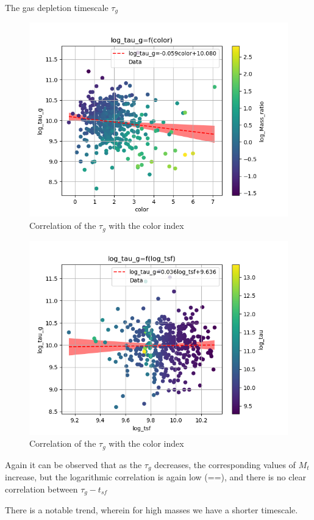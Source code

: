 \documentclass[presentation]{beamer}
\begin{document}
\begin{frame}[label={sec:org40e1c03}]{The gas depletion timescale \(\tau_g\) \label{SEC:tau_g}}
\begin{figure}[!htpb]
\centering
\includegraphics[width=.9\linewidth]{./figs/color-log_tau_g-color_log_Mass_ratio.png}
\caption{\label{fig:Correlation of the $\tau_g$ with the color index}Correlation of the \(\tau_g\) with the color index}
\end{figure}


\begin{figure}[!htpb]
\centering
\includegraphics[width=.9\linewidth]{./figs/log_tsf-log_tau_g-color_log_tau.png}
\caption{\label{fig:Correlation of the $\tau_g$ with the color index}Correlation of the \(\tau_g\) with the color index}
\end{figure}

Again it can be observed that as the \(\tau_g\) decreases, the corresponding values of \(M_t\) increase, but the logarithmic correlation is again low (==), and there is no clear correlation between \(\tau_g-t_{sf}\)

There is a notable trend, wherein for high masses we have a shorter timescale.
\end{frame}
\end{document}
